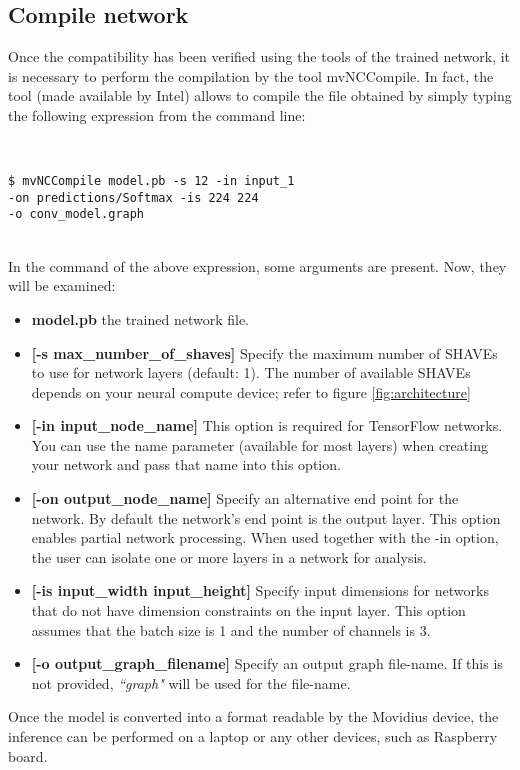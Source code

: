\subsection{Compile network}
\label{subsec:compilenetwork}
Once the compatibility has been verified using the tools of the 
trained network, it is necessary to perform the compilation by the tool mvNCCompile.
In fact, the tool (made available by Intel) allows to compile the file obtained by
simply typing the following expression from the command line:\\
{
\\
\begin{mycolorbox}[colback=light-gray]
	\scriptsize{\texttt{\$ mvNCCompile model.pb -s 12 -in input\_1 \\-on predictions/Softmax -is 224 224 \\-o conv\_model.graph}}
\end{mycolorbox}
}
\\In the command of the above expression, some arguments are present.
Now, they will be examined:
\begin{itemize}
\item \textbf{model.pb} the trained network file.
\item \textbf{[-s max\_number\_of\_shaves]} Specify the maximum number of SHAVEs 
to use for network layers (default: 1).
The number of available SHAVEs depends on your neural compute device; refer to 
figure \ref{fig:architecture}
\item \textbf{[-in input\_node\_name]} This option is required for TensorFlow 
networks. 
You can use the name parameter (available for most layers) when creating your 
network and pass that name into this option.
\item \textbf{[-on output\_node\_name]} Specify an alternative end point for the 
network. 
By default the network’s end point is the output layer. 
This option enables partial network processing. When used together with the 
-in option, the user can isolate one or more layers in a network for analysis.
\item \textbf{[-is input\_width input\_height]} Specify input dimensions for 
networks that do not have dimension constraints on the input layer.
This option assumes that the batch size is 1 and the number of channels is 3.
\item \textbf{[-o output\_graph\_filename]} Specify an output graph file-name. 
If this is not provided, \emph{``graph"} will be used for the file-name.
\end{itemize}
Once the model is converted into a format readable by the Movidius device, the 
inference can be performed on a laptop or any other devices, such as Raspberry board.
